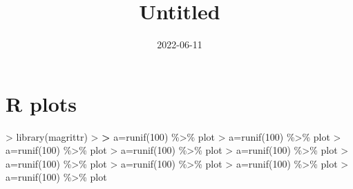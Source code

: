 \documentclass[
]{article}
\title{Untitled}
\author{}
\date{\vspace{-2.5em}2022-06-11}
\newenvironment{Shaded}{\begin{snugshade}}{\end{snugshade}}
\newcommand{\DecValTok}[1]{\textcolor[rgb]{0.00,0.00,0.81}{#1}}
\newcommand{\ErrorTok}[1]{\textcolor[rgb]{0.64,0.00,0.00}{\textbf{#1}}}
\newcommand{\FunctionTok}[1]{\textcolor[rgb]{0.00,0.00,0.00}{#1}}
\newcommand{\NormalTok}[1]{#1}
\newcommand{\OtherTok}[1]{\textcolor[rgb]{0.56,0.35,0.01}{#1}}
\newcommand{\SpecialCharTok}[1]{\textcolor[rgb]{0.00,0.00,0.00}{#1}}
\begin{document}
\maketitle

{
\setcounter{tocdepth}{2}
\tableofcontents
}
\hypertarget{r-plots}{%
\section{R plots}\label{r-plots}}

\begin{Shaded}
\begin{Highlighting}[]
\SpecialCharTok{\textgreater{}} \FunctionTok{library}\NormalTok{(magrittr)}
\SpecialCharTok{\textgreater{}} 
\ErrorTok{\textgreater{}}\NormalTok{ a}\OtherTok{=}\FunctionTok{runif}\NormalTok{(}\DecValTok{100}\NormalTok{) }\SpecialCharTok{\%\textgreater{}\%}\NormalTok{ plot}
\SpecialCharTok{\textgreater{}}\NormalTok{ a}\OtherTok{=}\FunctionTok{runif}\NormalTok{(}\DecValTok{100}\NormalTok{) }\SpecialCharTok{\%\textgreater{}\%}\NormalTok{ plot}
\SpecialCharTok{\textgreater{}}\NormalTok{ a}\OtherTok{=}\FunctionTok{runif}\NormalTok{(}\DecValTok{100}\NormalTok{) }\SpecialCharTok{\%\textgreater{}\%}\NormalTok{ plot}
\SpecialCharTok{\textgreater{}}\NormalTok{ a}\OtherTok{=}\FunctionTok{runif}\NormalTok{(}\DecValTok{100}\NormalTok{) }\SpecialCharTok{\%\textgreater{}\%}\NormalTok{ plot}
\SpecialCharTok{\textgreater{}}\NormalTok{ a}\OtherTok{=}\FunctionTok{runif}\NormalTok{(}\DecValTok{100}\NormalTok{) }\SpecialCharTok{\%\textgreater{}\%}\NormalTok{ plot}
\SpecialCharTok{\textgreater{}}\NormalTok{ a}\OtherTok{=}\FunctionTok{runif}\NormalTok{(}\DecValTok{100}\NormalTok{) }\SpecialCharTok{\%\textgreater{}\%}\NormalTok{ plot}
\SpecialCharTok{\textgreater{}}\NormalTok{ a}\OtherTok{=}\FunctionTok{runif}\NormalTok{(}\DecValTok{100}\NormalTok{) }\SpecialCharTok{\%\textgreater{}\%}\NormalTok{ plot}
\SpecialCharTok{\textgreater{}}\NormalTok{ a}\OtherTok{=}\FunctionTok{runif}\NormalTok{(}\DecValTok{100}\NormalTok{) }\SpecialCharTok{\%\textgreater{}\%}\NormalTok{ plot}
\SpecialCharTok{\textgreater{}}\NormalTok{ a}\OtherTok{=}\FunctionTok{runif}\NormalTok{(}\DecValTok{100}\NormalTok{) }\SpecialCharTok{\%\textgreater{}\%}\NormalTok{ plot}
\end{Highlighting}
\end{Shaded}
\end{document}
